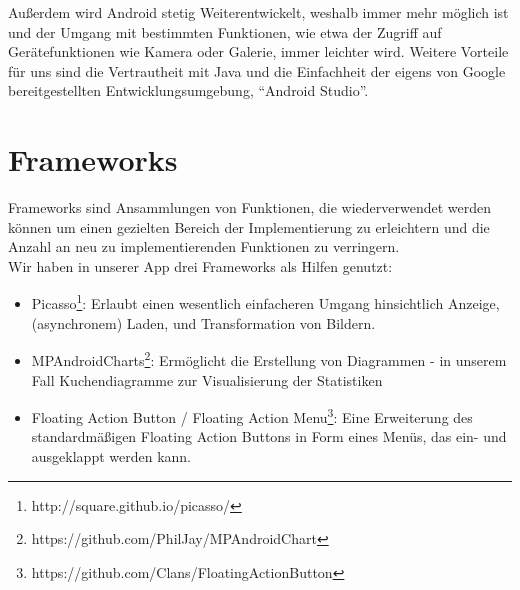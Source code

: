 Außerdem wird Android stetig Weiterentwickelt, weshalb immer mehr möglich ist und der Umgang mit bestimmten Funktionen, wie etwa der Zugriff auf Gerätefunktionen wie Kamera oder Galerie, immer leichter wird. Weitere Vorteile für uns sind die Vertrautheit mit Java und die Einfachheit der eigens von Google bereitgestellten Entwicklungsumgebung, ``Android Studio''.

\section{Frameworks}
\label{sec:grundlagen:frameworks}
Frameworks sind Ansammlungen von Funktionen, die wiederverwendet werden können um einen gezielten Bereich der Implementierung zu erleichtern und die Anzahl an neu zu implementierenden Funktionen zu verringern.\\
Wir haben in unserer App drei Frameworks als Hilfen genutzt:
\begin{itemize}
\item Picasso\footnote{http://square.github.io/picasso/}: Erlaubt einen wesentlich einfacheren Umgang hinsichtlich Anzeige, (asynchronem) Laden, und Transformation von Bildern.
\item MPAndroidCharts\footnote{https://github.com/PhilJay/MPAndroidChart}: Ermöglicht die Erstellung von Diagrammen - in unserem Fall Kuchendiagramme zur Visualisierung der Statistiken
\item Floating Action Button / Floating Action Menu\footnote{https://github.com/Clans/FloatingActionButton}: Eine Erweiterung des standardmäßigen Floating Action Buttons in Form eines Menüs, das ein- und ausgeklappt werden kann.
\end{itemize}



















